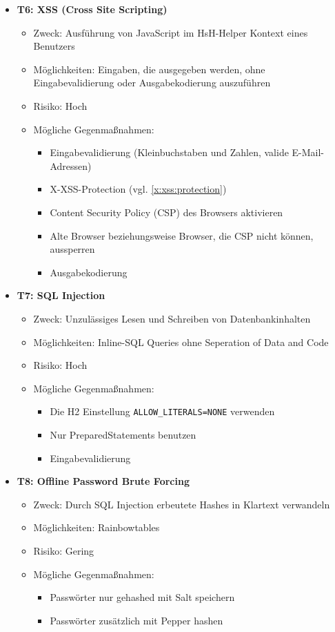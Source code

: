 \documentclass[12pt,DIV14,BCOR10mm,a4paper,parskip=half-,headsepline,headinclude,english,ngerman,bibliography=totocnumbered]{scrreprt}
\begin{document}
\begin{itemize}
  \hypertarget{threat6}{}
  \item \textbf{T6: XSS (Cross Site Scripting)}
  \begin{itemize}
  \item Zweck: Ausführung von JavaScript im HsH-Helper Kontext eines Benutzers
  \item Möglichkeiten: Eingaben, die ausgegeben werden, ohne Eingabevalidierung oder Ausgabekodierung auszuführen
  \item Risiko: Hoch
  \item Mögliche Gegenmaßnahmen:
	\begin{itemize}
		\item Eingabevalidierung (Kleinbuchstaben und Zahlen, valide E-Mail-Adressen)
		\item X-XSS-Protection (vgl. \ref{x:xss:protection})
		\item Content Security Policy (CSP) des Browsers aktivieren
		\item Alte Browser beziehungsweise Browser, die CSP nicht können, aussperren
		\item Ausgabekodierung
	\end{itemize}
  \end{itemize}

  \hypertarget{threat7}{}
  \item \textbf{T7: SQL Injection}
  \begin{itemize}
  \item Zweck: Unzulässiges Lesen und Schreiben von Datenbankinhalten
  \item Möglichkeiten: Inline-SQL Queries ohne Seperation of Data and Code
  \item Risiko: Hoch
  \item Mögliche Gegenmaßnahmen:
  \begin{itemize}
    \item Die H2 Einstellung \texttt{ALLOW\_LITERALS=NONE} verwenden
    \item Nur PreparedStatements benutzen
    \item Eingabevalidierung
  \end{itemize}
  \end{itemize}

  \hypertarget{threat8}{}
  \item \textbf{T8: Offline Password Brute Forcing}
  \begin{itemize}
  \item Zweck: Durch SQL Injection erbeutete Hashes in Klartext verwandeln
  \item Möglichkeiten: Rainbowtables
  \item Risiko: Gering
  \item Mögliche Gegenmaßnahmen:
  \begin{itemize}
    \item Passwörter nur gehashed mit Salt speichern
    \item Passwörter zusätzlich mit Pepper hashen
  \end{itemize}
  \end{itemize}


\end{itemize}
\end{document}
